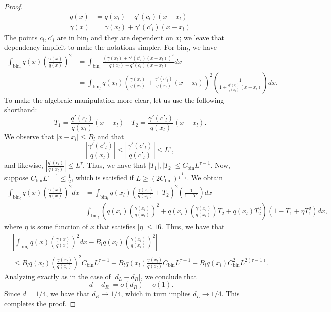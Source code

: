 \documentclass{article}
\newcommand{\bin}{\text{bin}}
\begin{document}
\begin{proof}
\begin{align*}
q(x) &= q(x_l) + q'(c_l)(x-x_l)  \\
\gamma(x) &= \gamma(x_l) + \gamma'(c'_l)(x - x_l) 
\end{align*}
The points $c_l, c'_l$ are in $\bin_l$ and they are dependent on $x$; we leave that dependency implicit to make the notations simpler. For $\bin_l$, we have
\begin{align*}
\int_{\bin_l} q(x) \left( \frac{\gamma(x)}{q(x)} \right)^2 &=
  \int_{\bin_l} 
      \frac{ (\gamma(x_l) + \gamma'(c'_l)(x - x_l))^2  }{ q(x_l) + q'(c_l)(x-x_l)} dx
  \\
&= \int_{\bin_l} q(x_l)
   \left( \frac{\gamma(x_l)}{q(x_l)} + \frac{\gamma'(c'_l)}{q(x_l)} (x - x_l) \right)^2
  \left( \frac{1}{1 + \frac{q'(c_l)}{q(x_l)} (x - x_l)} \right) dx.
\end{align*}
To make the algebraic manipulation more clear, let us use the following shorthand:
\[
T_1 = \frac{q'(c_l)}{q(x_l)} ( x - x_l) \quad
T_2 = \frac{\gamma'(c'_l)}{q(x_l)} ( x - x_l) . 
\]
We observe that $|x -x_l| \leq B_l$ and that
\[
\left| \frac{\gamma'(c'_l)}{q(x_l)} \right| 
    \leq \left| \frac{\gamma'(c'_l)}{q(c'_l)} \right| \leq L^\tau,
\]
and likewise,  $\left| \frac{q'(c_l)}{q(x_l)} \right| \leq L^\tau$. Thus, we have that $|T_1|, |T_2| \leq C_\bin L^{\tau -1}$. Now, suppose $C_\bin L^{\tau -1} \leq \frac{1}{2} $, which is satisfied if $L \geq (2 C_\bin)^{\frac{1}{1-\tau}}$. We obtain
\begin{align*}
\int_{\bin_l} q(x) \left( \frac{\gamma(x)}{q(x)} \right)^2 dx &= \int_{\bin_l} q(x_l) 
       \left( \frac{\gamma(x_l)}{q(x_l)} + T_2 \right)^2 
        \left( \frac{1}{ 1 + T_1 } \right) dx  \\
 =& \int_{\bin_l} \left( q(x_l) \left( \frac{\gamma(x_l)}{q(x_l)} \right)^2 + 
                q(x_l) \left( \frac{\gamma(x_l)}{q(x_l)} \right) T_2 + q(x_l) T_2^2 \right) 
    (1 - T_1 + \eta T_1^2) dx,
\end{align*}
where $\eta$ is some function of $x$ that satisfies $|\eta| \leq 16$. Thus, we have that
\begin{align*}
& \left| \int_{\bin_l} q(x) \left( \frac{\gamma(x)}{q(x)} \right)^2 dx - 
      B_l q(x_l) \left( \frac{\gamma(x_l)}{q(x_l)} \right)^2 \right| \\
& \leq   B_l q(x_l) \left( \frac{\gamma(x_l)}{q(x_l)} \right)^2 C_\bin L^{\tau-1} +
      B_l q(x_l) \frac{\gamma(x_l)}{q(x_l)} C_\bin L^{\tau-1} + B_l q(x_l) C_\bin^2 L^{2(\tau-1)}. 
\end{align*}
Analyzing exactly as in the case of $|d_L-d_R|$, we conclude that
$$|d - d_R| = o(d_R) + o(1).$$ 
Since $d = 1/4$, we have that $d_R \to 1/4$, which in turn implies $d_L \to 1/4$.  This completes the proof.
\end{proof}
\end{document}
